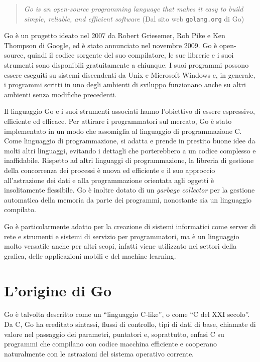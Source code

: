 \begin{quotation}
    \begin{small}
        \textit{Go is an open-source programming language that makes it easy to build simple, reliable, and efficient software} (Dal sito web \verb|golang.org| di Go)
    \end{small}
\end{quotation}
Go è un progetto ideato nel 2007 da Robert Griesemer, Rob Pike e Ken Thompson di Google, ed è stato annunciato nel novembre 2009.
Go è open-source, quindi il codice sorgente del suo compilatore, le sue librerie e i suoi strumenti sono disponibili gratuitamente a chiunque.
I suoi programmi possono essere eseguiti su sistemi discendenti da Unix e Microsoft Windows e, in generale, i programmi scritti in uno degli ambienti di sviluppo funzionano anche su altri ambienti senza modifiche precedenti.

Il linguaggio Go e i suoi strumenti associati hanno l'obiettivo di essere espressivo, efficiente ed efficace.
Per attirare i programmatori sul mercato, Go è stato implementato in un modo che assomiglia al linguaggio di programmazione C\@.
Come linguaggio di programmazione, si adatta e prende in prestito buone idee da molti altri linguaggi, evitando i dettagli che porterebbero a un codice complesso e inaffidabile.
Rispetto ad altri linguaggi di programmazione, la libreria di gestione della concorrenza dei processi è nuova ed efficiente e il suo approccio all'astrazione dei dati e alla programmazione orientata agli oggetti è insolitamente flessibile.
Go è inoltre dotato di un \textit{garbage collector} per la gestione automatica della memoria da parte dei programmi, nonostante sia un linguaggio compilato.

Go è particolarmente adatto per la creazione di sistemi informatici come server di rete e strumenti e sistemi di servizio per programmatori, ma è un linguaggio molto versatile anche per altri scopi, infatti viene utilizzato nei settori della grafica, delle applicazioni mobili e del machine learning.
\section*{L'origine di Go}
Go è talvolta descritto come un ``linguaggio C-like'', o come ``C del XXI secolo''.
Da C, Go ha ereditato sintassi, flussi di controllo, tipi di dati di base, chiamate di valore nel passaggio dei parametri, puntatori e, soprattutto, enfasi C su programmi che compilano con codice macchina efficiente e cooperano naturalmente con le astrazioni del sistema operativo corrente.


